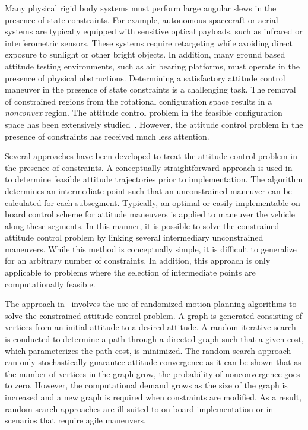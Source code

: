 \documentclass[10pt,fleqn]{IJCAS}  %
\begin{document}
\begin{multicols}{2}
Many physical rigid body systems must perform large angular slews in the presence of state constraints.
For example, autonomous spacecraft or aerial systems are typically equipped with sensitive optical payloads, such as infrared or interferometric sensors.
These systems require retargeting while avoiding direct exposure to sunlight or other bright objects.
In addition, many ground based attitude testing environments, such as air bearing platforms, must operate in the presence of physical obstructions.
Determining a satisfactory attitude control maneuver in the presence of state constraints is a challenging task.
The removal of constrained regions from the rotational configuration space results in a \textit{nonconvex} region.
The attitude control problem in the feasible configuration space has been extensively studied~\cite{bullo2004,MayTeePaCC11,LEEITAC15}.
However, the attitude control problem in the presence of constraints has received much less attention.

Several approaches have been developed to treat the attitude control problem in the presence of constraints.
A conceptually straightforward approach is used in~\cite{hablani1999} to determine feasible attitude trajectories prior to implementation.
The algorithm determines an intermediate point such that an unconstrained maneuver can be calculated for each subsegment.
Typically, an optimal or easily implementable on-board control scheme for attitude maneuvers is applied to maneuver the vehicle along these segments.
In this manner, it is possible to solve the constrained attitude control problem by linking several intermediary unconstrained maneuvers.
While this method is conceptually simple, it is difficult to generalize for an arbitrary number of constraints.
In addition, this approach is only applicable to problems where the selection of intermediate points are computationally feasible.

The approach in~\cite{frazzoli2001} involves the use of randomized motion planning algorithms to solve the constrained attitude control problem.
A graph is generated consisting of vertices from an initial attitude to a desired attitude. 
A random iterative search is conducted to determine a path through a directed graph such that a given cost, which parameterizes the path cost, is minimized.
The random search approach can only stochastically guarantee attitude convergence as it can be shown that as the number of vertices in the graph grow, the probability of nonconvergence goes to zero.
However, the computational demand grows as the size of the graph is increased and a new graph is required when constraints are modified. 
As a result, random search approaches are ill-suited to on-board implementation or in scenarios that require agile maneuvers.


\end{multicols}
\end{document}
